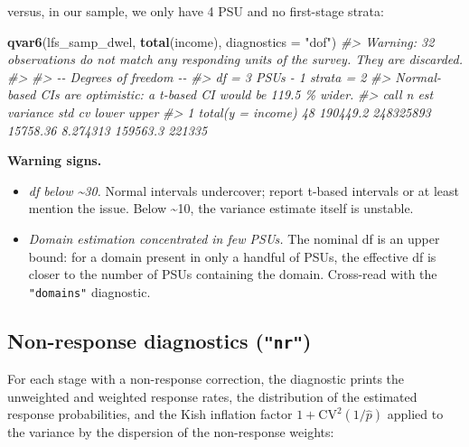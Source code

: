 \documentclass[
]{article}
\newenvironment{Shaded}{\begin{snugshade}}{\end{snugshade}}
\newcommand{\AttributeTok}[1]{\textcolor[rgb]{0.13,0.29,0.53}{#1}}
\newcommand{\CommentTok}[1]{\textcolor[rgb]{0.56,0.35,0.01}{\textit{#1}}}
\newcommand{\FunctionTok}[1]{\textcolor[rgb]{0.13,0.29,0.53}{\textbf{#1}}}
\newcommand{\NormalTok}[1]{#1}
\newcommand{\StringTok}[1]{\textcolor[rgb]{0.31,0.60,0.02}{#1}}
\providecommand{\tightlist}{%
  \setlength{\itemsep}{0pt}\setlength{\parskip}{0pt}}
\begin{document}
versus, in our sample, we only have 4 PSU and no first-stage strata:

\begin{Shaded}
\begin{Highlighting}[]
\FunctionTok{qvar6}\NormalTok{(lfs\_samp\_dwel, }\FunctionTok{total}\NormalTok{(income), }\AttributeTok{diagnostics =} \StringTok{"dof"}\NormalTok{)}
\CommentTok{\#\textgreater{} Warning: 32 observations do not match any responding units of the survey. They are discarded.}
\CommentTok{\#\textgreater{} }
\CommentTok{\#\textgreater{} {-}{-} Degrees of freedom {-}{-}}
\CommentTok{\#\textgreater{}   df = 3 PSUs {-} 1 strata = 2}
\CommentTok{\#\textgreater{}   Normal{-}based CIs are optimistic: a t{-}based CI would be 119.5 \% wider.}
\CommentTok{\#\textgreater{}                call  n      est  variance      std       cv    lower  upper}
\CommentTok{\#\textgreater{} 1 total(y = income) 48 190449.2 248325893 15758.36 8.274313 159563.3 221335}
\end{Highlighting}
\end{Shaded}

\textbf{Warning signs.}

\begin{itemize}
\tightlist
\item
  \emph{df below \textasciitilde30.} Normal intervals undercover; report
  t-based intervals or at least mention the issue. Below
  \textasciitilde10, the variance estimate itself is unstable.
\item
  \emph{Domain estimation concentrated in few PSUs.} The nominal df is
  an upper bound: for a domain present in only a handful of PSUs, the
  effective df is closer to the number of PSUs containing the domain.
  Cross-read with the \texttt{"domains"} diagnostic.
\end{itemize}

\subsection{\texorpdfstring{Non-response diagnostics
(\texttt{"nr"})}{Non-response diagnostics ("nr")}}\label{non-response-diagnostics-nr}

For each stage with a non-response correction, the diagnostic prints the
unweighted and weighted response rates, the distribution of the
estimated response probabilities, and the Kish inflation factor
\(1 + \mathrm{CV}^2(1/\hat p)\) applied to the variance by the
dispersion of the non-response weights:
\end{document}
